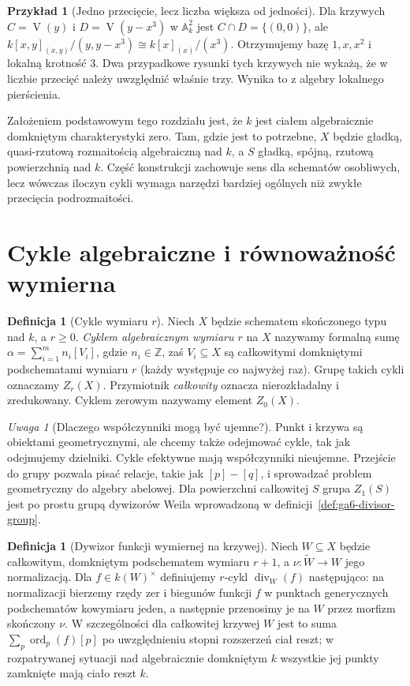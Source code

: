 \documentclass[11pt,a4paper,openany]{report}
\numberwithin{equation}{section}
\theoremstyle{plain}
\theoremstyle{definition}
\newtheorem{definicja}[twierdzenie]{Definicja}
\newtheorem{przyklad}[twierdzenie]{Przykład}
\theoremstyle{remark}
\newtheorem{uwaga}[twierdzenie]{Uwaga}
\newcommand{\Z}{\mathbb Z}
\newcommand{\A}{\mathbb A}
\newcommand{\V}{\operatorname V}
\begin{document}
\begin{przyklad}[Jedno przecięcie, lecz liczba większa od jedności]
Dla krzywych $C=\V(y)$ i $D=\V(y-x^3)$ w $\A^2_k$ jest
$C\cap D=\{(0,0)\}$, ale
$k[x,y]_{(x,y)}/(y,y-x^3)\cong k[x]_{(x)}/(x^3)$.
Otrzymujemy bazę $1,x,x^2$ i lokalną krotność $3$.
Dwa przypadkowe rysunki tych krzywych nie wykażą,
że w liczbie przecięć należy uwzględnić właśnie trzy.
Wynika to z algebry lokalnego pierścienia.
\end{przyklad}

Założeniem podstawowym tego rozdziału jest, że $k$ jest
ciałem algebraicznie domkniętym charakterystyki zero.
Tam, gdzie jest to potrzebne, $X$ będzie gładką,
quasi-rzutową rozmaitością algebraiczną nad $k$,
a $S$ gładką, spójną, rzutową powierzchnią nad $k$.
Część konstrukcji zachowuje sens dla schematów osobliwych,
lecz wówczas iloczyn cykli wymaga narzędzi bardziej ogólnych
niż zwykłe przecięcia podrozmaitości.

\section{Cykle algebraiczne i równoważność wymierna}
\label{sec:ga7-cycles}

\begin{definicja}[Cykle wymiaru $r$]
\label{def:ga7-cycles}
Niech $X$ będzie schematem skończonego typu nad $k$, a $r\ge0$.
\emph{Cyklem algebraicznym wymiaru $r$} na $X$ nazywamy formalną
sumę $\alpha=\sum_{i=1}^m n_i[V_i]$, gdzie $n_i\in\Z$,
zaś $V_i\subseteq X$ są całkowitymi domkniętymi podschematami
wymiaru $r$ (każdy występuje co najwyżej raz).
Grupę takich cykli oznaczamy $Z_r(X)$.
Przymiotnik \emph{całkowity} oznacza nierozkładalny i zredukowany.
Cyklem zerowym nazywamy element $Z_0(X)$.
\end{definicja}

\begin{uwaga}[Dlaczego współczynniki mogą być ujemne?]
Punkt i krzywa są obiektami geometrycznymi, ale chcemy także
odejmować cykle, tak jak odejmujemy dzielniki.
Cykle efektywne mają współczynniki nieujemne.
Przejście do grupy pozwala pisać relacje, takie jak
$[p]-[q]$, i sprowadzać problem geometryczny do algebry abelowej.
Dla powierzchni całkowitej $S$ grupa $Z_1(S)$
jest po prostu grupą dywizorów Weila wprowadzoną w
definicji~\ref{def:ga6-divisor-group}.
\end{uwaga}

\begin{definicja}[Dywizor funkcji wymiernej na krzywej]
\label{def:ga7-rational-divisor}
Niech $W\subseteq X$ będzie całkowitym, domkniętym
podschematem wymiaru $r+1$, a $\nu:\widetilde W\to W$
jego normalizacją. Dla $f\in k(W)^\times$ definiujemy
$r$-cykl $\operatorname{div}_W(f)$ następująco:
na normalizacji bierzemy rzędy zer i biegunów funkcji $f$
w punktach generycznych podschematów kowymiaru jeden,
a następnie przenosimy je na $W$ przez morfizm skończony $\nu$.
W szczególności dla całkowitej krzywej $W$ jest to
suma $\sum_p\operatorname{ord}_p(f)[p]$ po uwzględnieniu
stopni rozszerzeń ciał reszt; w rozpatrywanej sytuacji
nad algebraicznie domkniętym $k$ wszystkie jej punkty zamknięte
mają ciało reszt $k$.
\end{definicja}
\end{document}
